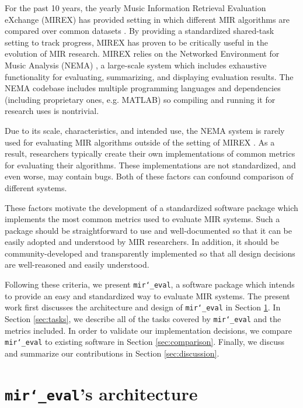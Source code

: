 \documentclass{article}
\def\mireval{\texttt{mir\char`_eval}}
\begin{document}
For the past 10 years, the yearly Music Information Retrieval Evaluation eXchange (MIREX) has provided setting in which different MIR algorithms are compared over common datasets \cite{downie2008music}.
By providing a standardized shared-task setting to track progress, MIREX has proven to be critically useful in the evolution of MIR research.
MIREX relies on the Networked Environment for Music Analysis (NEMA) \cite{west2010networked}, a large-scale system which includes exhaustive functionality for evaluating, summarizing, and displaying evaluation results.
The NEMA codebase includes multiple programming languages and dependencies (including proprietary ones, e.g. MATLAB) so compiling and running it for research uses is nontrivial.

Due to its scale, characteristics, and intended use, the NEMA system is rarely used for evaluating MIR algorithms outside of the setting of MIREX \cite{downie2008music}.
As a result, researchers typically create their own implementations of common metrics for evaluating their algorithms.
These implementations are not standardized, and even worse, may contain bugs.
Both of these factors can confound comparison of different systems.

These factors motivate the development of a standardized software package which implements the most common metrics used to evaluate MIR systems.
Such a package should be straightforward to use and well-documented so that it can be easily adopted and understood by MIR researchers.
In addition, it should be community-developed and transparently implemented so that all design decisions are well-reasoned and easily understood.

Following these criteria, we present \mireval{}, a software package which intends to provide an easy and standardized way to evaluate MIR systems.
The present work first discusses the architecture and design of \mireval{} in Section \ref{sec:architecture}.
In Section \ref{sec:tasks}, we describe all of the tasks covered by \mireval{} and the metrics included.
In order to validate our implementation decisions, we compare \mireval{} to existing software in Section \ref{sec:comparison}.
Finally, we discuss and summarize our contributions in Section \ref{sec:discussion}.

\section{\mireval{}'s architecture}
\label{sec:architecture}
\end{document}
